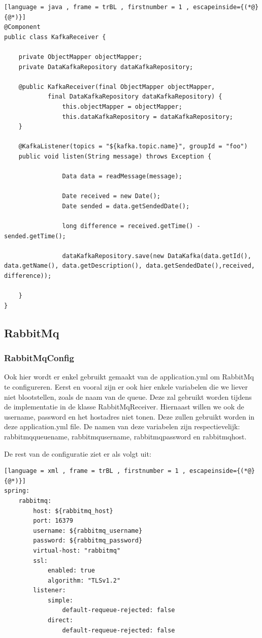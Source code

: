 \begin{lstlisting}[language = java , frame = trBL , firstnumber = 1 , escapeinside={(*@}{@*)}]
@Component
public class KafkaReceiver {

    private ObjectMapper objectMapper;
    private DataKafkaRepository dataKafkaRepository;

    @public KafkaReceiver(final ObjectMapper objectMapper,
            final DataKafkaRepository dataKafkaRepository) {
                this.objectMapper = objectMapper;
                this.dataKafkaRepository = dataKafkaRepository;
    }

    @KafkaListener(topics = "${kafka.topic.name}", groupId = "foo")
    public void listen(String message) throws Exception {
           
                Data data = readMessage(message);

                Date received = new Date();
                Date sended = data.getSendedDate();

                long difference = received.getTime() - sended.getTime();

                dataKafkaRepository.save(new DataKafka(data.getId(), data.getName(), data.getDescription(), data.getSendedDate(),received, difference));

    }
}
\end{lstlisting}
\subsection{RabbitMq}
\subsubsection{RabbitMqConfig}
Ook hier wordt er enkel gebruikt gemaakt van de application.yml om RabbitMq te configureren. Eerst en vooral zijn er ook hier enkele variabelen die we liever niet blootstellen, zoals de naam van de queue. Deze zal gebruikt worden tijdens de implementatie in de klasse RabbitMqReceiver. Hiernaast willen we ook de username,  password en het hostadres niet tonen. Deze zullen gebruikt worden in deze application.yml file. De namen van deze variabelen zijn respectievelijk: rabbitmq\textunderscore queue\textunderscore name, rabbitmq\textunderscore username, rabbitmq\textunderscore password en rabbitmq\textunderscore host. 

De rest van de configuratie ziet er als volgt uit: 
\begin{lstlisting}[language = xml , frame = trBL , firstnumber = 1 , escapeinside={(*@}{@*)}]
spring:
    rabbitmq:
        host: ${rabbitmq_host}
        port: 16379
        username: ${rabbitmq_username}
        password: ${rabbitmq_password}
        virtual-host: "rabbitmq"
        ssl:
            enabled: true
            algorithm: "TLSv1.2"
        listener:
            simple:
                default-requeue-rejected: false
            direct:
                default-requeue-rejected: false
\end{lstlisting}

